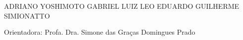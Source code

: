   \begin{capa}
	\begin{center}
	\Large\imprimirinstituicao
	\end{center}

	\begin{center}
	\vspace*{2.6cm}
	\Large ADRIANO YOSHIMOTO
	\linebreak
	\Large GABRIEL LUIZ
	\linebreak
	\Large LEO EDUARDO
	\linebreak
	\Large GUILHERME SIMIONATTO
	\vspace*{1.5cm}
	
	\Large \textbf{\imprimirtitulo}
	
	\vspace*{2.4cm}
	
	\noindent Orientadora: Profa. Dra. Simone das Graças Domingues Prado
	
	\vspace*{2.4cm}
	
	{\large\imprimirlocal}
	\par
	{\large\imprimirdata}
	\vspace*{1cm}
	\end{center}
  \end{capa}